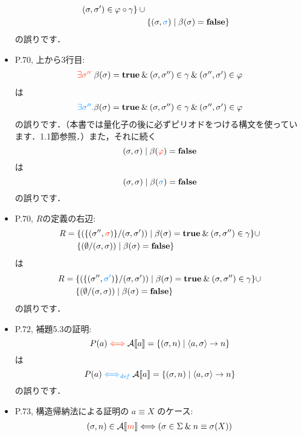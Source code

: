 \documentclass[12pt,titlepage,twoside,openright,dvipdfmx]{jsbook}
\newcommand\old[1]{%
  \textcolor[rgb]{1.0,0.25,0.1}{#1}%
  }
\newcommand\new[1]{%
  \textcolor[rgb]{0,0.55,1.0}{#1}%
  }
\theoremstyle{definition}
\begin{document}
\begin{itemize}
\begin{align*}
                   (\sigma,\sigma')\in \varphi\circ\gamma \} \cup {} \\
                 & \{(\sigma,\new{\sigma})\mid \beta(\sigma)=\mathbf{false} \}
  \end{align*}
  の誤りです．
\item P.70, 上から3行目:
  \[
    \begin{array}{l}
      \old{\exists{\sigma''}\ }\beta(\sigma)=\mathbf{true}\AND
      (\sigma,\sigma'')\in\gamma \AND
      (\sigma'',\sigma')\in\varphi
    \end{array}
  \]
  は
  \[
    \begin{array}{l}
      \new{\exists{\sigma''}. }\beta(\sigma)=\mathbf{true}\AND
      (\sigma,\sigma'')\in\gamma \AND
      (\sigma'',\sigma')\in\varphi
    \end{array}
  \]
  の誤りです．（本書では量化子の後に必ずピリオドをつける構文を使ってい
  ます．1.1節参照．）また，それに続く
  \[
    (\sigma,\sigma)\mid  \beta(\old{\varphi})=\mathbf{false}
  \]
  は
  \[
    (\sigma,\sigma)\mid  \beta(\new{\sigma})=\mathbf{false}
  \]
  の誤りです．
\item P.70, $R$の定義の右辺:
  \begin{align*}
    R = {} &\{(\{(\sigma'',\old{\sigma})\}/(\sigma,\sigma'))\mid
             \beta(\sigma)=\mathbf{true}\AND
             (\sigma,\sigma'')\in\gamma \} \cup \\
           &\{(\emptyset/(\sigma,\sigma))\mid \beta(\sigma)=\mathbf{false}\}
  \end{align*}
  は
  \begin{align*}
    R = {} &\{(\{(\sigma'',\new{\sigma'})\}/(\sigma,\sigma'))\mid
             \beta(\sigma)=\mathbf{true}\AND
             (\sigma,\sigma'')\in\gamma \} \cup \\
           &\{(\emptyset/(\sigma,\sigma))\mid \beta(\sigma)=\mathbf{false}\}
  \end{align*}
  の誤りです．
\item P.72, 補題5.3の証明:
  \[
    P(a)\old{{} \Longleftrightarrow {}}
    \denotation{A}{a}=\{ (\sigma,n) \mid   \tuple{a,\sigma}\rightarrow n\}
  \]
  は
  \[
    P(a)\new{{} \Longleftrightarrow_{\mathit{def}} {}}
    \denotation{A}{a}=\{ (\sigma,n) \mid   \tuple{a,\sigma}\rightarrow n\}
  \]
  の誤りです．
\item P.73, 構造帰納法による証明の $a \equiv X$ のケース:
  \[
    \begin{array}{l@{}l}
      (\sigma, n)\in\denotation{A}{\old{m}}
      & {} \Longleftrightarrow (\sigma\in\Sigma\AND n\equiv \sigma(X)) \\

\end{array}\]
\end{itemize}
\end{document}
